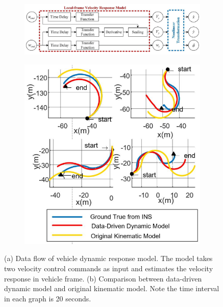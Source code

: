 \documentclass[../thesis.tex]{subfiles}
\begin{document}
\begin{figure}[t]
	\centering
	\begin{subfigure}[b]{0.7\linewidth}
		\includegraphics[width=\columnwidth]{./RRTPlanner/fig/vehicle_model_block.png}
		\subcaption{}
		\label{fig:vehicle_model_block}
	\end{subfigure}
	\begin{subfigure}[b]{0.28\linewidth}
		\includegraphics[width=\columnwidth]{./RRTPlanner/fig/vehicle_model_plot.png}
		\subcaption{}
		\label{fig:vehicle_model_plot}
	\end{subfigure}
	\caption{(a) Data flow of vehicle dynamic response model. The model takes two velocity control commands as input and estimates the velocity response in vehicle frame. (b) Comparison between data-driven dynamic model and original kinematic model. Note the time interval in each graph is 20 seconds.}
    \label{fig:vehicle_model}
\end{figure}
\end{document}

